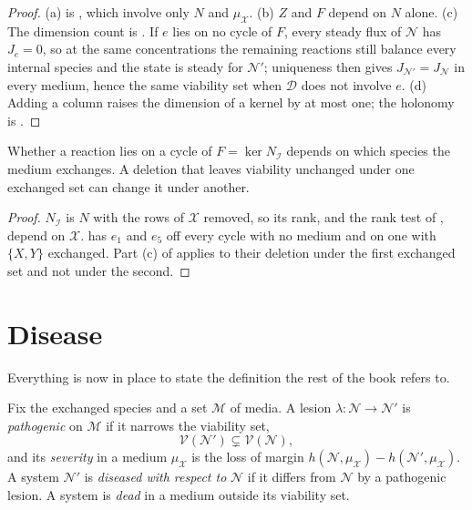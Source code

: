 \begin{proof}
(a) is , which involve only $N$ and
$\mu_{\mathcal X}$. (b) $Z$ and $F$ depend on $N$ alone. (c) The dimension
count is . If $e$ lies on no cycle of $F$, every steady
flux of $\mathcal N$ has $J_e=0$, so at the same concentrations the
remaining reactions still balance every internal species and the state is
steady for $\mathcal N'$; uniqueness then gives
$J_{\mathcal N'}=J_{\mathcal N}$ in every medium, hence the same viability
set when $\mathcal D$ does not involve $e$. (d) Adding a column raises the
dimension of a kernel by at most one; the holonomy is .
\end{proof}

\begin{corollary}
\label{c1:cor-medium}
\lnkD{} Whether a reaction lies on a cycle of $F=\ker N_{\mathcal I}$
depends on which species the medium exchanges. A deletion that leaves
viability unchanged under one exchanged set can change it under another.
\end{corollary}

\begin{proof}
$N_{\mathcal I}$ is $N$ with the rows of $\mathcal X$ removed, so its rank,
and the rank test of , depend on $\mathcal X$.
 has $e_1$ and $e_5$ off every cycle with no medium and on
one with $\{X,Y\}$ exchanged. Part (c) of  applies to
their deletion under the first exchanged set and not under the second.
\end{proof}

\section{Disease}
\label{c1:sec-disease}

Everything is now in place to state the definition the rest of the book
refers to.

\begin{definition}[Disease]
\label{c1:def-disease}
Fix the exchanged species and a set $\mathcal M$ of media. A lesion
$\lambda\colon\mathcal N\to\mathcal N'$ is \emph{pathogenic} on
$\mathcal M$ if it narrows the viability set,
\[
\mathcal V(\mathcal N')\subsetneq\mathcal V(\mathcal N),
\]
and its \emph{severity} in a medium $\mu_{\mathcal X}$ is the loss of margin
$h(\mathcal N,\mu_{\mathcal X})-h(\mathcal N',\mu_{\mathcal X})$. A system
$\mathcal N'$ is \emph{diseased with respect to} $\mathcal N$ if it differs
from $\mathcal N$ by a pathogenic lesion. A system is \emph{dead} in a
medium outside its viability set.
\end{definition}

